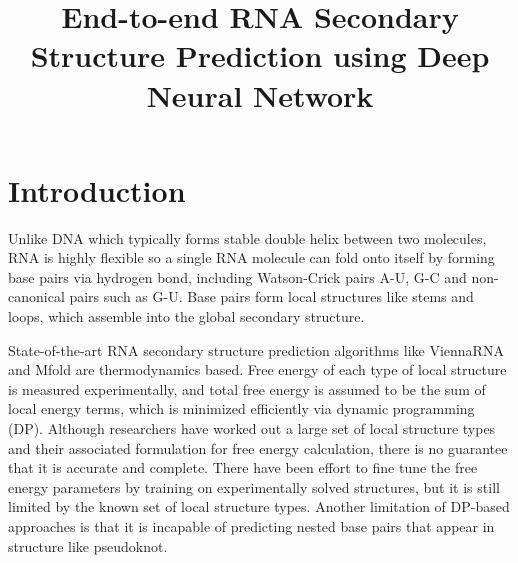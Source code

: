\documentclass{article}
\title{End-to-end RNA Secondary Structure Prediction using Deep Neural Network}
\begin{document}
\maketitle


\vspace*{-7em}

\section{Introduction}

Unlike DNA which typically forms stable double helix between two molecules, RNA is highly flexible
so a single RNA molecule can fold onto itself by
forming base pairs via hydrogen bond, including Watson-Crick pairs A-U,
G-C and non-canonical pairs such as G-U.
Base pairs form local structures like stems and loops,
which assemble into the global secondary structure.

State-of-the-art RNA secondary structure prediction algorithms
like ViennaRNA\cite{lorenz2011viennarna} and Mfold\cite{zuker2003mfold}
are thermodynamics based.
Free energy of each type of local structure is measured experimentally,
and total free energy is assumed to be the sum of local energy terms,
which is minimized efficiently via dynamic programming (DP).
Although researchers have worked out a large set of local structure types and
their associated formulation for free energy calculation,
there is no guarantee that it is accurate and complete.
There have been effort to fine tune the free energy parameters by
training on experimentally solved structures\cite{andronescu2007efficient},
but it is still limited by the known set of local structure types.
Another limitation of DP-based approaches is that
it is incapable of predicting nested base pairs that appear in structure like pseudoknot.


\end{document}
